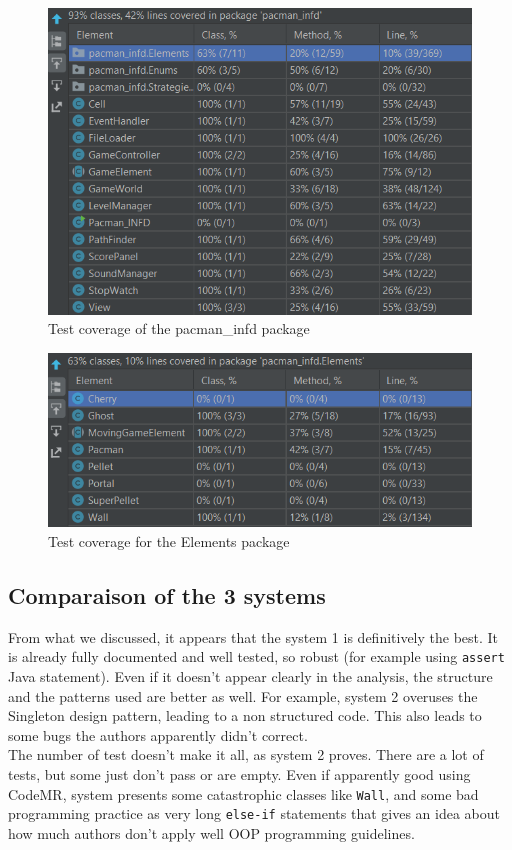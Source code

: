 \documentclass[]{article}
\begin{document}
\begin{figure}[h!]
\centering
\includegraphics[width=0.75\linewidth]{testCov2.png}
\caption{Test coverage of the pacman\_infd package}
\label{fig:S3_test_coverage0}
\end{figure}

\begin{figure}[h!]
\centering
\includegraphics[width=0.75\linewidth]{testCov3.png}
\caption{Test coverage for the Elements package}
\label{fig:S3_test_coverage2}
\end{figure}

\newpage

\subsection{Comparaison of the 3 systems}

From what we discussed, it appears that the system 1 is definitively the best. It is already fully documented and well tested, so robust (for example using \texttt{assert} Java statement). Even if it doesn't appear clearly in the analysis, the structure and the patterns used are better as well. For example, system 2 overuses the Singleton design pattern, leading to a non structured code. This also leads to some bugs the authors apparently didn't correct.\\

The number of test doesn't make it all, as system 2 proves. There are a lot of tests, but some just don't pass or are empty. Even if apparently good using CodeMR, system presents some catastrophic classes like \texttt{Wall}, and some bad programming practice as very long \texttt{else-if} statements that gives an idea about how much authors don't apply well OOP programming guidelines. 
\end{document}
